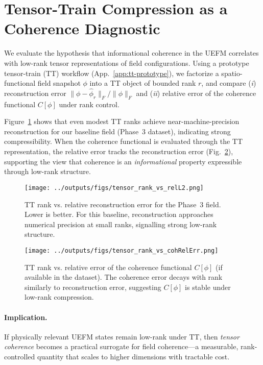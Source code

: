 \section{Tensor-Train Compression as a Coherence Diagnostic}
\label{sec:tensor-results}

We evaluate the hypothesis that informational coherence in the UEFM correlates
with low-rank tensor representations of field configurations. Using a prototype
tensor-train (TT) workflow (App.~\ref{app:tt-prototype}), we factorize a
spatio-functional field snapshot $\phi$ into a TT object of bounded rank $r$,
and compare (\emph{i}) reconstruction error $\|\phi - \hat{\phi}_r\|_F/\|\phi\|_F$
and (\emph{ii}) relative error of the coherence functional $C[\phi]$ under rank
control.

Figure~\ref{fig:tt-rank-relL2} shows that even modest TT ranks achieve
near-machine-precision reconstruction for our baseline field (Phase~3 dataset),
indicating strong compressibility. When the coherence functional is evaluated
through the TT representation, the relative error tracks the reconstruction
error (Fig.~\ref{fig:tt-rank-cohrel}), supporting the view that coherence is an
\emph{informational} property expressible through low-rank structure.

\begin{figure}[H]
  \centering
  \texttt{[image: ../outputs/figs/tensor\_rank\_vs\_relL2.png]}
  \caption{TT rank vs. relative reconstruction error for the Phase~3 field.
  Lower is better. For this baseline, reconstruction approaches numerical
  precision at small ranks, signalling strong low-rank structure.}
  \label{fig:tt-rank-relL2}
\end{figure}

\begin{figure}[H]
  \centering
  \texttt{[image: ../outputs/figs/tensor\_rank\_vs\_cohRelErr.png]}
  \caption{TT rank vs. relative error of the coherence functional $C[\phi]$
  (if available in the dataset). The coherence error decays with rank similarly
  to reconstruction error, suggesting $C[\phi]$ is stable under low-rank
  compression.}
  \label{fig:tt-rank-cohrel}
\end{figure}

\paragraph{Implication.}
If physically relevant UEFM states remain low-rank under TT, then \emph{tensor
coherence} becomes a practical surrogate for field coherence---a measurable,
rank-controlled quantity that scales to higher dimensions with tractable cost.
